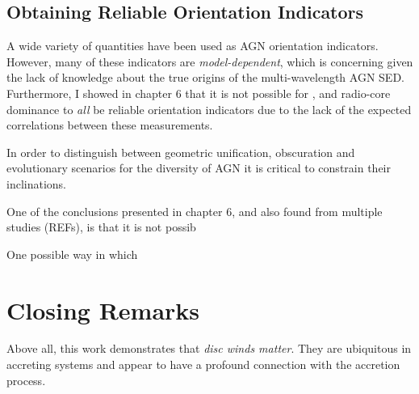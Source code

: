 \subsection{Obtaining Reliable Orientation Indicators}

A wide variety of quantities have been used as AGN orientation
indicators. However, many of these indicators are {\em model-dependent},
which is concerning given the lack of knowledge about the true
origins of the multi-wavelength AGN SED. Furthermore, I showed in
chapter 6 that it is not possible for \ewo, \fwh and radio-core 
dominance to {\em all} be reliable orientation indicators due to
the lack of the expected correlations between these measurements.

In order to distinguish between geometric unification, obscuration 
and evolutionary scenarios for the diversity of AGN it is 
critical to constrain their inclinations.

One of the conclusions presented in chapter 6, and also found
from multiple studies (REFs), is that it is not possib

One possible way in which 


\section{Closing Remarks}

Above all, this work demonstrates that {\em disc winds matter}.
They are ubiquitous in accreting systems and appear to have a 
profound connection with the accretion process. 










